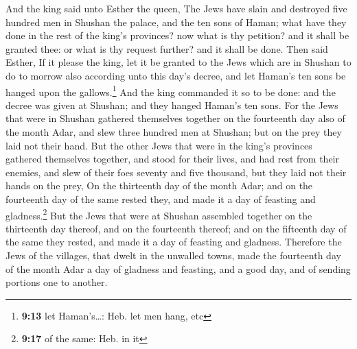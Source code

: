  And the king said unto Esther the queen, The Jews have
slain and destroyed five hundred men in Shushan the palace, and the ten
sons of Haman; what have they done in the rest of the king's provinces?
now what is thy petition? and it shall be granted thee: or what is thy
request further? and it shall be done.  Then said Esther,
If it please the king, let it be granted to the Jews which are in
Shushan to do to morrow also according unto this day's decree, and let
Haman's ten sons be hanged upon the gallows.\footnote{\textbf{9:13} let
  Haman's\ldots: Heb. let men hang, etc}  And the king
commanded it so to be done: and the decree was given at Shushan; and
they hanged Haman's ten sons.  For the Jews that were in
Shushan gathered themselves together on the fourteenth day also of the
month Adar, and slew three hundred men at Shushan; but on the prey they
laid not their hand.  But the other Jews that were in the
king's provinces gathered themselves together, and stood for their
lives, and had rest from their enemies, and slew of their foes seventy
and five thousand, but they laid not their hands on the prey,
 On the thirteenth day of the month Adar; and on the
fourteenth day of the same rested they, and made it a day of feasting
and gladness.\footnote{\textbf{9:17} of the same: Heb. in it}
 But the Jews that were at Shushan assembled together on
the thirteenth day thereof, and on the fourteenth thereof; and on the
fifteenth day of the same they rested, and made it a day of feasting and
gladness.  Therefore the Jews of the villages, that dwelt
in the unwalled towns, made the fourteenth day of the month Adar a day
of gladness and feasting, and a good day, and of sending portions one to
another.

